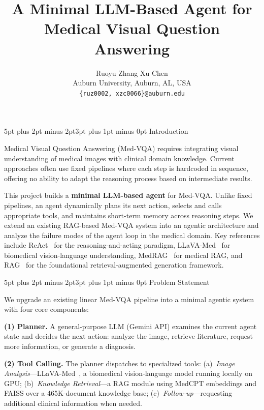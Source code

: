 \documentclass[10pt,twocolumn,letterpaper]{article}
\makeatletter
\renewcommand\section{\@startsection{section}{1}{\z@}%
  {5pt plus 2pt minus 2pt}{3pt plus 1pt minus 0pt}%
  {\large\bfseries}}
\makeatother
\begin{document}
\title{A Minimal LLM-Based Agent for Medical Visual Question Answering}
\author{Ruoyu Zhang \quad Xu Chen\\
Auburn University, Auburn, AL, USA\\
{\tt\small \{ruz0002, xzc0066\}@auburn.edu}
}
\maketitle

\vspace{-2pt}
\section{Introduction}

Medical Visual Question Answering (Med-VQA) requires integrating visual understanding of medical images with clinical domain knowledge. Current approaches often use fixed pipelines where each step is hardcoded in sequence, offering no ability to adapt the reasoning process based on intermediate results.

This project builds a \textbf{minimal LLM-based agent} for Med-VQA. Unlike fixed pipelines, an agent dynamically plans its next action, selects and calls appropriate tools, and maintains short-term memory across reasoning steps. We extend an existing RAG-based Med-VQA system into an agentic architecture and analyze the failure modes of the agent loop in the medical domain. Key references include ReAct~\cite{yao2023react} for the reasoning-and-acting paradigm, LLaVA-Med~\cite{li2024llavamed} for biomedical vision-language understanding, MedRAG~\cite{xiong2024benchmarking} for medical RAG, and RAG~\cite{lewis2020retrieval} for the foundational retrieval-augmented generation framework.

\section{Problem Statement}

We upgrade an existing linear Med-VQA pipeline into a minimal agentic system with four core components:

\textbf{(1) Planner.} A general-purpose LLM (Gemini API) examines the current agent state and decides the next action: analyze the image, retrieve literature, request more information, or generate a diagnosis.

\textbf{(2) Tool Calling.} The planner dispatches to specialized tools: (a)~\textit{Image Analysis}---LLaVA-Med~\cite{li2024llavamed}, a biomedical vision-language model running locally on GPU; (b)~\textit{Knowledge Retrieval}---a RAG module using MedCPT embeddings and FAISS over a 465K-document knowledge base; (c)~\textit{Follow-up}---requesting additional clinical information when needed.
\end{document}
